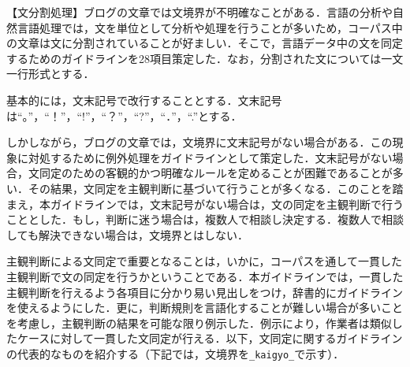\documentclass[japanese]{jnlp_1.4}
\begin{document}
  【文分割処理】ブログの文章では文境界が不明確なことがある．言語の分析や自然言語処理では，文を単位として分析や処理を行うことが多いため，コーパス中の文章は文に分割されていることが好ましい．そこで，言語データ中の文を同定するためのガイドラインを28項目策定した．なお，分割された文については一文一行形式とする．


  基本的には，文末記号で改行することとする．文末記号は``。''，``！''，``!''，``？''，``?''，``．''，``.''とする．


  しかしながら，ブログの文章では，文境界に文末記号がない場合がある．この現象に対処するために例外処理をガイドラインとして策定した．文末記号がない場合，文同定のための客観的かつ明確なルールを定めることが困難であることが多い．その結果，文同定を主観判断に基づいて行うことが多くなる．このことを踏まえ，本ガイドラインでは，文末記号がない場合は，文の同定を主観判断で行うこととした．もし，判断に迷う場合は，複数人で相談し決定する．複数人で相談しても解決できない場合は，文境界とはしない．


主観判断による文同定で重要となることは，いかに，コーパスを通して一貫した主観判断で文の同定を行うかということである．本ガイドラインでは，一貫した主観判断を行えるよう各項目に分かり易い見出しをつけ，辞書的にガイドラインを使えるようにした．更に，判断規則を言語化することが難しい場合が多いことを考慮し，主観判断の結果を可能な限り例示した．例示により，作業者は類似したケースに対して一貫した文同定が行える．以下，文同定に関するガイドラインの代表的なものを紹介する（下記では，文境界を{\tt \_kaigyo\_}で示す）\<．
\end{document}
